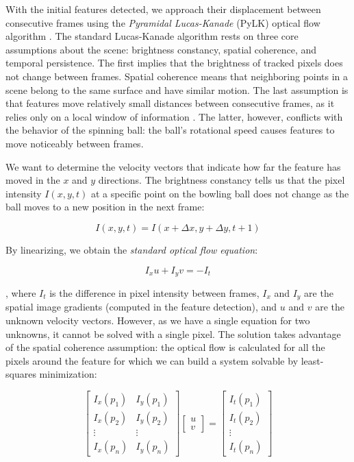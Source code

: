 With the initial features detected, we approach their displacement between consecutive frames using the \emph{Pyramidal Lucas-Kanade} (PyLK) optical flow algorithm \cite{BOUGUET00}. The standard Lucas-Kanade algorithm rests on three core assumptions about the scene: brightness constancy, spatial coherence, and temporal persistence. The first implies that the brightness of tracked pixels does not change between frames. Spatial coherence means that neighboring points in a scene belong to the same surface and have similar motion. The last assumption is that features move relatively small distances between consecutive frames, as it relies only on a local window of information \cite{BRADSKI08}. The latter, however, conflicts with the behavior of the spinning ball: the ball’s rotational speed causes features to move noticeably between frames.

We want to determine the velocity vectors that indicate how far the feature has moved in the $x$ and $y$ directions. The brightness constancy tells us that the pixel intensity $I(x, y, t)$ at a specific point on the bowling ball does not change as the ball moves to a new position in the next frame:

\begin{equation}
I(x, y, t) = I(x + \Delta x, y + \Delta y, t + 1)
\end{equation}

By linearizing, we obtain the \emph{standard optical flow equation}:

\begin{equation}
I_xu + I_yv = -I_t
\end{equation}

, where $I_t$ is the difference in pixel intensity between frames, $I_x$ and $I_y$ are the spatial image gradients (computed in the feature detection), and $u$ and $v$ are the unknown velocity vectors. However, as we have a single equation for two unknowns, it cannot be solved with a single pixel. The solution takes advantage of the spatial coherence assumption: the optical flow is calculated for all the pixels around the feature for which we can build a system solvable by least-squares minimization:

\begin{equation}
\begin{bmatrix}
I_x(p_1) & I_y(p_1) \\
I_x(p_2) & I_y(p_2) \\
\vdots & \vdots \\
I_x(p_n) & I_y(p_n)
\end{bmatrix}
\begin{bmatrix}u \\ v\end{bmatrix} =
\begin{bmatrix}I_t(p_1) \\ I_t(p_2) \\ \vdots \\ I_t(p_n)\end{bmatrix}
\end{equation}

